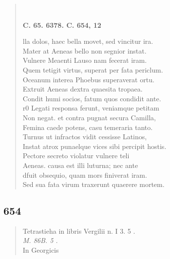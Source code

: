 \documentclass[11pt, a4paper]{report}
\begin{document}
\begin{verse}
        ﻿\pagebreak 
    \begin{center} \textbf{C. 65. 6378. C. 654, 12} \end{center} \marginpar{[125]} lla dolos, haec bella movet, sed vincitur ira. \\ Mater at Aeneas bello non segnior instat. \\ Vulnere Meaenti Lauso nam fecerat iram. \\ Quem tetigit virtus, superat per fata periclum. \\ Oceanum interea \rbrack  Phoebus superaverat ortu. \\ Extruit Aeneas dextra quaesita tropaea. \\ Condit humi socios, fatum quos condidit ante. \\ r0 Legati responsa ferunt, veniamque petitam \\ Non negat. et contra pugnat secura Camilla, \\ Femina caede potens, casu temeraria tanto. \\ Turnus ut infractos \rbrack  vidit cessisse Latinos, \\ Instat atrox punaelque vices sibi percipit hostis. \\ Pectore secreto violatur vulnere teli \\ Aeneas. causa est illi luturna; nec ante \\ dfuit obsequio, quam mors finiverat iram. \\ Sed sua fata virum traxerunt quaerere mortem. \\ 
      \end{verse}
  
            \subsection*{654}
      \begin{verse}
      Tetrastieha in libris Vergilii n. I 3. 5 . \\ \textit{M. 86B. 5 .} \\ In Georgicis \\ 
      \end{verse}
  
\end{document}
